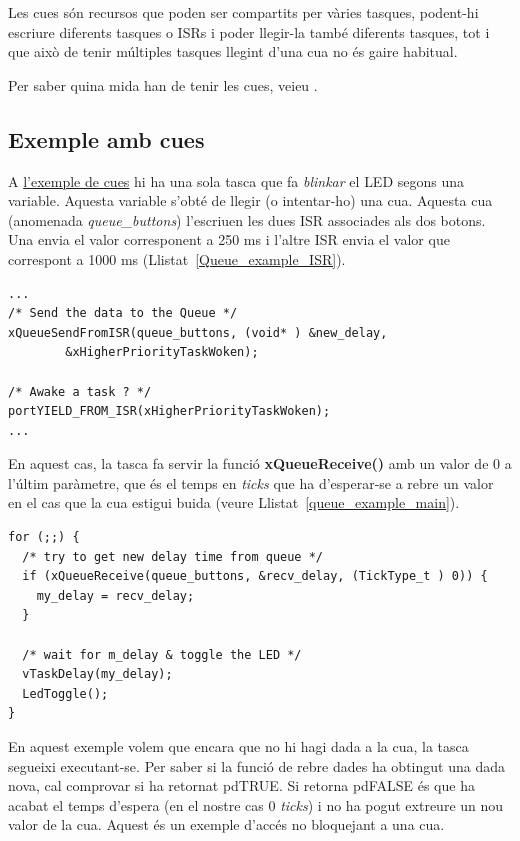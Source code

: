 Les cues són recursos que poden ser compartits per vàries tasques, podent-hi escriure diferents tasques o \glspl{ISR} i poder llegir-la també diferents tasques, tot i que això de tenir múltiples tasques llegint d'una cua no és gaire habitual.

Per saber quina mida han de tenir les cues, veieu .
\subsection{Exemple amb cues}
\label{sub:cues_exemple}
A \href{https://github.com/mariusmm/cursembedded/tree/master/Simplicity/FreeRTOS_Queue}{l'exemple de cues} hi ha una sola tasca que fa {\em blinkar} el \gls{LED} segons una variable. Aquesta variable s'obté de llegir (o intentar-ho) una cua. Aquesta cua (anomenada {\em queue\_buttons}) l'escriuen les dues \gls{ISR} associades als dos botons. Una envia el valor corresponent a 250 ms i l'altre ISR envia el valor que correspont a 1000 ms (Llistat~\ref{Queue_example_ISR}).

\begin{lstlisting}[style=customc, label=Queue_example_ISR, caption=Part del codi d'una de les ISRs]
...
/* Send the data to the Queue */
xQueueSendFromISR(queue_buttons, (void* ) &new_delay,
		&xHigherPriorityTaskWoken);

/* Awake a task ? */
portYIELD_FROM_ISR(xHigherPriorityTaskWoken);
...
\end{lstlisting}


En aquest cas, la tasca fa servir la funció {\bf xQueueReceive()} amb un valor de 0 a l'últim paràmetre, que és el temps en {\em ticks} que ha d'esperar-se a rebre un valor en el cas que la cua estigui buida (veure Llistat~\ref{queue_example_main}).

\begin{lstlisting}[style=customc,label=queue_example_main, caption=Part principal de la tasca TaskLedToggle]
for (;;) {
  /* try to get new delay time from queue */
  if (xQueueReceive(queue_buttons, &recv_delay, (TickType_t ) 0)) {
    my_delay = recv_delay;
  }

  /* wait for m_delay & toggle the LED */
  vTaskDelay(my_delay);
  LedToggle();
}
\end{lstlisting}

En aquest exemple volem que encara que no hi hagi dada a la cua, la tasca segueixi executant-se. Per saber si la funció de rebre dades ha obtingut una dada nova, cal comprovar si ha retornat \gls{pdTRUE}. Si retorna \gls{pdFALSE} és que ha acabat el temps d'espera (en el nostre cas 0 {\em ticks}) i no ha pogut extreure un nou valor de la cua. Aquest és un exemple d'accés no bloquejant a una cua.

